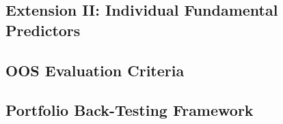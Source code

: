 \subsection{Extension II: Individual Fundamental Predictors}

\subsection{OOS Evaluation Criteria}
\subsection{Portfolio Back-Testing Framework}